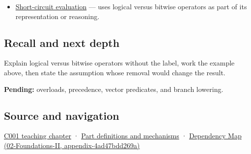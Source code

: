 \begin{itemize}
\tightlist
\item
  \hyperref[appendix-2e245a6fa8d3]{Short-circuit evaluation} --- uses logical versus bitwise operators as part of its representation or reasoning.
\end{itemize}

\subsection{Recall and next depth}\label{appendix-fe6b457d68d8-recall-and-next-depth}

Explain logical versus bitwise operators without the label, work the example above, then state the assumption whose removal would change the result.

\textbf{Pending:} overloads, precedence, vector predicates, and branch lowering.

\subsection{Source and navigation}\label{appendix-fe6b457d68d8-source-and-navigation}

\hyperref[01-foundations-i-ch001-from-a-signal-to-an-interpretation]{C001 teaching chapter} · \hyperref[appendix-fd090d982a15]{Part definitions and mechanisms} · \href{../02-Foundations-II/main.pdf\#nameddest=appendix-4ad47bdd269a}{Dependency Map (02-Foundations-II, appendix-4ad47bdd269a)}
